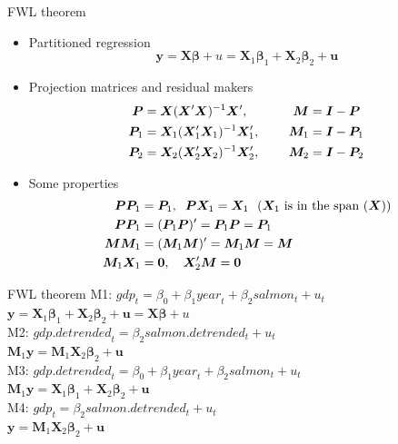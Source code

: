 \documentclass{beamer}
\begin{document}
\begin{frame}{FWL theorem}
\begin{itemize}
\item Partitioned regression
\begin{equation} \label{FWLpart}
\bm{y} = \bm{X}  \bm{\beta} + u = 
\bm{X}_1 \bm{\beta}_1 + \bm{X}_2 \bm{\beta}_2 + \bm{u}
\end{equation}
\item Projection matrices and residual makers
\begin{align*}
\bm{P}  & = \bm{X}(\bm{X}^{\prime}\bm{X})^{-1}\bm{X}^{\prime}, \hspace{0.5cm}
& \bm{M} & = \bm{I} - \bm{P}\\
\bm{P}_1 & = \bm{X}_1(\bm{X}_1^{\prime}\bm{X}_1)^{-1}\bm{X}_1^{\prime}, \hspace{0.5cm} & \bm{M}_1 & =\bm{I}-\bm{P}_1\\
\bm{P}_2 & = \bm{X}_2 (\bm{X}_2^{\prime}\bm{X}_2)^{-1}\bm{X}_2^{\prime}, \hspace{0.5cm} & \bm{M}_2 & =\bm{I}-\bm{P}_2
\end{align*}
\item Some properties
\begin{align*}
\bm{P}\bm{P}_1 & = \bm{P}_1, \hspace{0.2cm} \bm{P}\bm{X}_1 = \bm{X}_1~~ \textnormal{($\bm{X}_1$ is in the span ($\bm{X}$))}\\
\bm{P}\bm{P}_1 & = (\bm{P}_1\bm{P})^{\prime}=\bm{P}_1\bm{P}=\bm{P}_1\\
\bm{M}\bm{M}_1 & = (\bm{M}_1\bm{M})^{\prime}=\bm{M}_1\bm{M}=\bm{M} \\
\bm{M}_1\bm{X}_1 & = \bm{0}, \quad \bm{X}_2^{\prime}\bm{M}=\bm{0} \\
\end{align*}
\end{itemize}
\end{frame}


\begin{frame}{FWL theorem}
M1: $\textit{gdp}_t = \beta_0 + \beta_1 \textit{year}_t + \beta_2 \textit{salmon}_t + u_t$\\
$ \bm{y} = \bm{X}_1 \bm{\beta}_1 + \bm{X}_2 \bm{\beta}_2 + \bm{u}=\bm{X} \bm{\beta} + u$\\
\vspace{0.5cm}
M2: $\textit{gdp.detrended}_t = \beta_2 \textit{salmon.detrended}_t + u_t$\\
$\bm{M}_1 \bm{y} = \bm{M}_1\bm{X}_2\bm{\beta}_2+\bm{u}$\\
\vspace{0.5cm}
M3: $\textit{gdp.detrended}_t = \beta_0 + \beta_1 \textit{year}_t + \beta_2 \textit{salmon}_t + u_t$\\
$\bm{M}_1 \bm{y} = \bm{X}_1 \bm{\beta}_1 + \bm{X}_2\bm{\beta}_2+\bm{u}$\\
\vspace{0.5cm}
M4: $\textit{gdp}_t = \beta_2 \textit{salmon.detrended}_t + u_t$ \\
$\bm{y} = \bm{M}_1\bm{X}_2 \bm{\beta}_2 +\bm{u}$\\
\end{frame}
\end{document}
